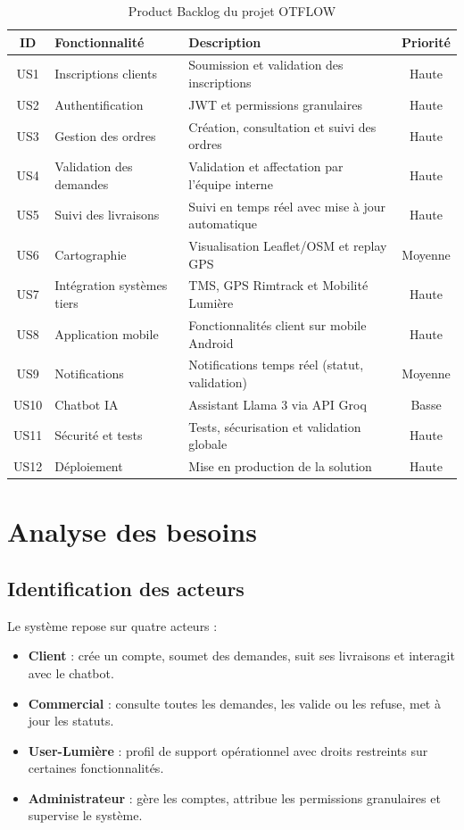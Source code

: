 \documentclass[12pt,a4paper,oneside]{report}
\begin{document}
\begin{table}[H]
\centering
\caption{Product Backlog du projet OTFLOW}
\begin{tabular}{|c|p{3.6cm}|p{5.2cm}|c|}
\hline
\textbf{ID} & \textbf{Fonctionnalité} & \textbf{Description} & \textbf{Priorité} \\
\hline
US1  & Inscriptions clients       & Soumission et validation des inscriptions & Haute \\
\hline
US2  & Authentification           & JWT et permissions granulaires & Haute \\
\hline
US3  & Gestion des ordres         & Création, consultation et suivi des ordres & Haute \\
\hline
US4  & Validation des demandes    & Validation et affectation par l'équipe interne & Haute \\
\hline
US5  & Suivi des livraisons       & Suivi en temps réel avec mise à jour automatique & Haute \\
\hline
US6  & Cartographie               & Visualisation Leaflet/OSM et replay GPS & Moyenne \\
\hline
US7  & Intégration systèmes tiers & TMS, GPS Rimtrack et Mobilité Lumière & Haute \\
\hline
US8  & Application mobile         & Fonctionnalités client sur mobile Android & Haute \\
\hline
US9  & Notifications              & Notifications temps réel (statut, validation) & Moyenne \\
\hline
US10 & Chatbot IA                 & Assistant Llama 3 via API Groq & Basse \\
\hline
US11 & Sécurité et tests          & Tests, sécurisation et validation globale & Haute \\
\hline
US12 & Déploiement                & Mise en production de la solution & Haute \\
\hline
\end{tabular}
\end{table}

\section{Analyse des besoins}

\subsection{Identification des acteurs}
Le système repose sur quatre acteurs :
\begin{itemize}
    \item \textbf{Client} : crée un compte, soumet des demandes, suit ses livraisons et interagit avec le chatbot.
    \item \textbf{Commercial} : consulte toutes les demandes, les valide ou les refuse, met à jour les statuts.
    \item \textbf{User-Lumière} : profil de support opérationnel avec droits restreints sur certaines fonctionnalités.
    \item \textbf{Administrateur} : gère les comptes, attribue les permissions granulaires et supervise le système.
\end{itemize}
\end{document}
